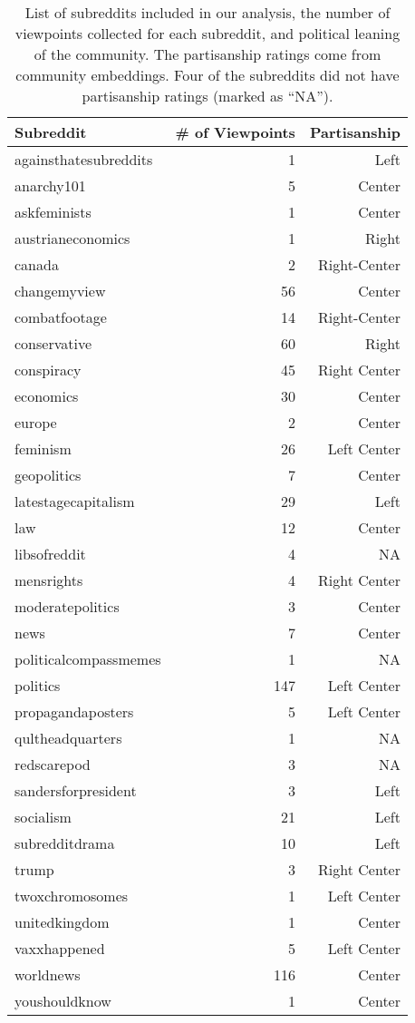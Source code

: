 \begin{table}[ht!]
    \small
    \centering
    \caption{List of subreddits included in our analysis, the number of viewpoints collected for each subreddit, and political leaning of the community. The partisanship ratings come from \citet{waller2021quantifying} community embeddings. Four of the subreddits did not have partisanship ratings (marked as ``NA'').}
    \begin{tabular}{lrr}
    \toprule
    Subreddit &  \# of Viewpoints & Partisanship\\
    \midrule
    againsthatesubreddits & 1 & Left\\
    anarchy101 & 5 & Center\\
    askfeminists & 1 & Center\\
    austrianeconomics & 1 & Right\\
    canada & 2 & Right-Center\\
    changemyview & 56 & Center\\
    combatfootage & 14 & Right-Center\\
    conservative & 60 & Right\\
    conspiracy & 45 & Right Center\\
    economics & 30& Center\\
    europe & 2& Center\\
    feminism & 26& Left Center\\
    geopolitics & 7& Center\\
    latestagecapitalism & 29& Left\\
    law & 12& Center\\
    libsofreddit & 4&NA\\
    mensrights & 4& Right Center\\
    moderatepolitics & 3& Center\\
    news & 7& Center\\
    politicalcompassmemes & 1& NA\\
    politics & 147 & Left Center\\
    propagandaposters & 5 & Left Center\\
    qultheadquarters & 1 & NA\\
    redscarepod & 3 & NA\\
    sandersforpresident & 3 & Left\\
    socialism & 21 & Left\\
    subredditdrama & 10 & Left\\
    trump & 3 & Right Center\\
    twoxchromosomes & 1 & Left Center\\
    unitedkingdom & 1 & Center\\
    vaxxhappened & 5 & Left Center\\
    worldnews & 116 & Center\\
    youshouldknow & 1 & Center\\
    \bottomrule
    \end{tabular}
    \label{tab:subreddits}
\end{table}